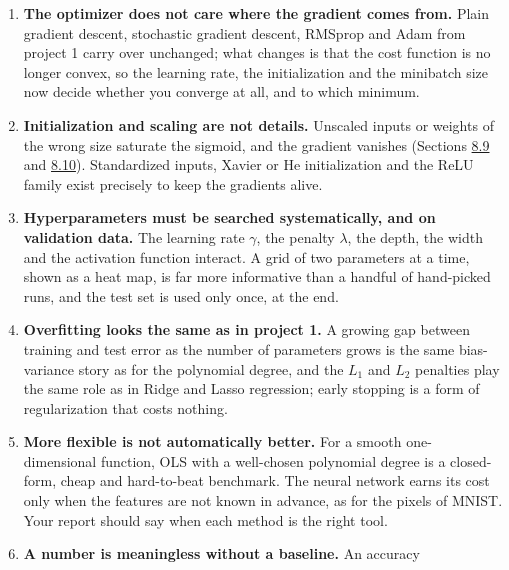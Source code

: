 \documentclass[11pt,a4paper]{article}
\begin{document}
\begin{enumerate}[nosep]
        the MSE) gives tiny gradients exactly where the network is
        confidently wrong.
  \item \textbf{The optimizer does not care where the gradient comes from.}
        Plain gradient descent, stochastic gradient descent, RMSprop and Adam
        from project 1 carry over unchanged; what changes is that the cost
        function is no longer convex, so the learning rate, the
        initialization and the minibatch size now decide whether you converge
        at all, and to which minimum.
  \item \textbf{Initialization and scaling are not details.}  Unscaled
        inputs or weights of the wrong size saturate the sigmoid, and the
        gradient vanishes (Sections
        \href{https://educationalmaterialuio.github.io/MachineLearningUiO/doc/LectureNotes/_build/html/chapter8.html#vanishing-and-exploding-gradients}{8.9}
        and
        \href{https://educationalmaterialuio.github.io/MachineLearningUiO/doc/LectureNotes/_build/html/chapter8.html#weight-initialisation}{8.10}).
        Standardized inputs,
        Xavier or He initialization and the ReLU family exist precisely to
        keep the gradients alive.
  \item \textbf{Hyperparameters must be searched systematically, and on
        validation data.}  The learning rate $\gamma$, the penalty $\lambda$,
        the depth, the width and the activation function interact.  A grid
        of two parameters at a time, shown as a heat map, is far more
        informative than a handful of hand-picked runs, and the test set is
        used only once, at the end.
  \item \textbf{Overfitting looks the same as in project 1.}  A growing gap
        between training and test error as the number of parameters grows is
        the same bias-variance story as for the polynomial degree, and the
        $L_1$ and $L_2$ penalties play the same role as in Ridge and Lasso
        regression; early stopping is a form of regularization that costs
        nothing.
  \item \textbf{More flexible is not automatically better.}  For a smooth
        one-dimensional function, OLS with a well-chosen polynomial degree is
        a closed-form, cheap and hard-to-beat benchmark.  The neural network
        earns its cost only when the features are not known in advance, as
        for the pixels of MNIST.  Your report should say when each method is
        the right tool.
  \item \textbf{A number is meaningless without a baseline.}  An accuracy

\end{enumerate}
\end{document}
